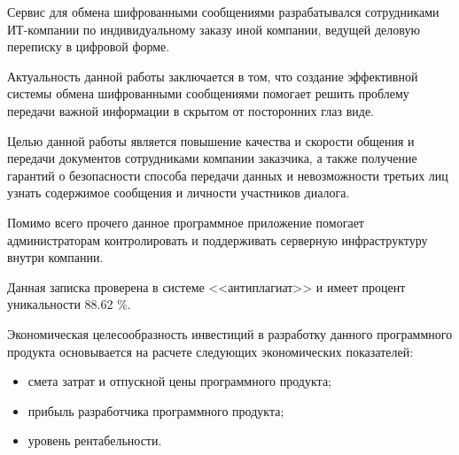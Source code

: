 Сервис для обмена шифрованными сообщениями разрабатывался сотрудниками ИТ-компании по индивидуальному заказу иной компании, ведущей деловую переписку в цифровой форме.

Актуальность данной работы заключается в том, что создание эффективной системы обмена шифрованными сообщениями помогает решить проблему передачи важной информации в скрытом от посторонних глаз виде.

Целью данной работы является повышение качества и скорости общения и передачи документов сотрудниками компании заказчика, а также получение гарантий о безопасности способа передачи данных и невозможности третьих лиц узнать содержимое сообщения и личности участников диалога.

Помимо всего прочего данное программное приложение помогает администраторам контролировать и поддерживать серверную инфраструктуру внутри компании.

Данная записка проверена в системе <<антиплагиат>> и имеет процент уникальности 88.62 \%.

Экономическая целесообразность инвестиций в разработку данного программного продукта основывается на расчете следующих экономических показателей:
\begin{itemize}
    \item смета затрат и отпускной цены программного продукта;
    \item прибыль разработчика программного продукта;
    \item уровень рентабельности.
\end{itemize}